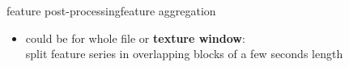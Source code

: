 		\begin{frame}{feature post-processing}{feature aggregation}
            \begin{itemize}
                \item       could be for whole file or \textbf{texture window}:\\ split feature series in overlapping blocks of a few seconds length

\end{itemize}
\end{frame}
